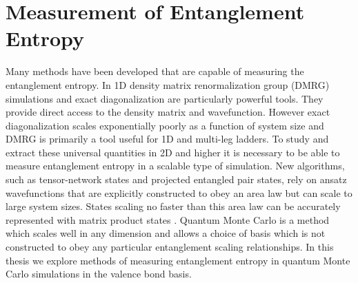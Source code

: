 \section{Measurement of Entanglement Entropy}

Many methods have been developed that are capable of measuring the entanglement entropy. In 1D density matrix renormalization group (DMRG) simulations and exact diagonalization are particularly powerful tools. They provide direct access to the density matrix and wavefunction. However exact diagonalization scales exponentially poorly as a function of system size and DMRG is primarily a tool useful for 1D and multi-leg ladders. To study and extract these universal quantities in 2D and higher it is necessary to be able to measure entanglement entropy in a scalable type of simulation. 
New algorithms, such as tensor-network states and projected entangled pair states, rely on ansatz wavefunctions that are explicitly constructed to obey an area law \cite{MERA,PEPS1,PEPS2} but can scale to large system sizes. States scaling no faster than this area law can be accurately represented with matrix product states \cite{MPS_DMRG}. Quantum Monte Carlo is a method which scales well in any dimension and allows a choice of basis which is not constructed to obey any particular entanglement scaling relationships. In this thesis we explore methods of measuring entanglement entropy in quantum Monte Carlo simulations in the valence bond basis.


